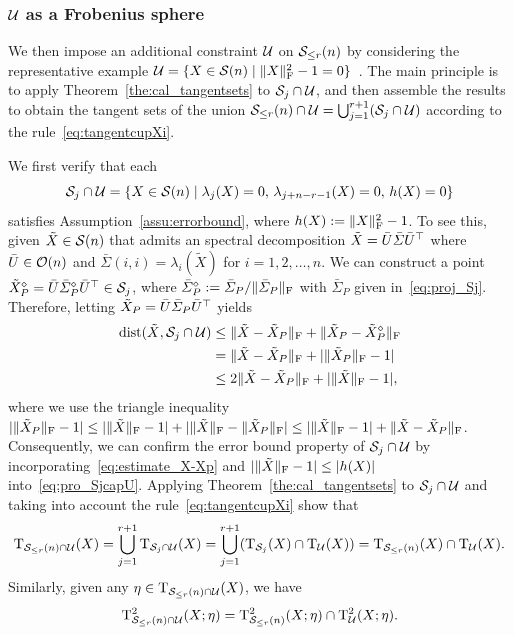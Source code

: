 \subsubsection{$\mathcal{U}$ as a Frobenius sphere}
We then impose an additional constraint $\mathcal{U}$ on $\mathcal{S}_{\le r}(n)$ by considering the representative example $\mathcal{U}=\{X\in\mathcal{S}(n)\mid \|X\|_{\mathrm{F}}^2-1=0\}$~\cite{cason2013iterative,li2020jotaspectral}. The main principle is to apply Theorem~\ref{the:cal_tangentsets} to $\mathcal{S}_j\cap\mathcal{U}$, and then assemble the results to obtain the tangent sets of the union $\mathcal{S}_{\le r}(n)\cap\mathcal{U}=\bigcup_{j=1}^{r+1}(\mathcal{S}_j\cap\mathcal{U})$ according to the rule~\eqref{eq:tangentcupXi}.

We first verify that each 
$$\mathcal{S}_j\cap\mathcal{U}=\{X\in\mathcal{S}(n)\mid\lambda_{j}(X)=0,\,\lambda_{j+n-r-1}(X)=0,\,h(X)=0\}$$
satisfies Assumption~\ref{assu:errorbound}, where $h(X):=\|X\|_{\mathrm{F}}^2-1$. To see this, given $\tilde{X} \in \mathcal{S}(n)$ that admits an spectral decomposition $\tilde{X}=\bar{U} \bar{\varSigma}\bar{U}^\top$ where $\bar{U}\in\mathcal{O}(n)$ and $\bar{\varSigma}(i,i)=\lambda_i(\tilde{X})$ for $i=1,2,\ldots,n$. We can construct a point $\tilde{X}^{\diamond}_P=\bar{U}\bar{\varSigma}^{\diamond}_P\bar{U}^\top\in\mathcal{S}_j$, 
where $\bar{\varSigma}^{\diamond}_P:=\bar{\varSigma}_P/\|\bar{\varSigma}_P\|_{\mathrm{F}}$ with $\bar{\varSigma}_P$ given in~\eqref{eq:proj_Sj}. Therefore, letting $\tilde{X}_P=\bar{U}\bar{\varSigma}_P\bar{U}^\top$ yields
\begin{align}
\operatorname{dist}(\tilde{X},\mathcal{S}_j\cap\mathcal{U}) &\le \|\tilde{X}-\tilde{X}_P\|_{\mathrm{F}} + \|\tilde{X}_P-\tilde{X}^\diamond_P\|_{\mathrm{F}} \nonumber
\\
&= \|\tilde{X}-\tilde{X}_P\|_{\mathrm{F}} + |\|\tilde{X}_P\|_{\mathrm{F}}-1|  \nonumber
\\
&\le 2\|\tilde{X}-\tilde{X}_P\|_{\mathrm{F}} + |\|\tilde{X}\|_{\mathrm{F}}-1|, \label{eq:pro_SjcapU}
\end{align}
where we use the triangle inequality $|\|\tilde{X}_P\|_{\mathrm{F}}-1|\le |\|\tilde{X}\|_{\mathrm{F}}-1| + |\|\tilde{X}\|_{\mathrm{F}}-\|\tilde{X}_P\|_{\mathrm{F}}|\le |\|\tilde{X}\|_{\mathrm{F}}-1| + \|\tilde{X}-\tilde{X}_P\|_{\mathrm{F}}$. Consequently, we can confirm the error bound property of $\mathcal{S}_j\cap\mathcal{U}$ by incorporating~\eqref{eq:estimate_X-Xp} and $|\|\tilde{X}\|_{\mathrm{F}}-1| \le |h(X)|$ into~\eqref{eq:pro_SjcapU}. Applying Theorem~\ref{the:cal_tangentsets} to $\mathcal{S}_j\cap\mathcal{U}$ and taking into account the rule~\eqref{eq:tangentcupXi} show that
\begin{align*}
    \mathrm{T}_{\mathcal{S}_{\le r}(n)\cap\mathcal{U}}(X) = \bigcup_{j=1}^{r+1} \mathrm{T}_{\mathcal{S}_j\cap\mathcal{U}}(X) =\bigcup_{j=1}^{r+1}(\mathrm{T}_{\mathcal{S}_j}(X) \cap \mathrm{T}_{\mathcal{U}}(X)) = \mathrm{T}_{\mathcal{S}_{\le r}(n)}(X)\cap\mathrm{T}_{\mathcal{U}}(X).
\end{align*}
Similarly, given any $\eta\in\mathrm{T}_{\mathcal{S}_{\le r}(n)\cap\mathcal{U}}(X)$, we have
\begin{align*}
    \mathrm{T}^2_{\mathcal{S}_{\le r}(n)\cap\mathcal{U}}(X;\eta) = \mathrm{T}^2_{\mathcal{S}_{\le r}(n)}(X;\eta)\cap\mathrm{T}^2_{\mathcal{U}}(X;\eta).
\end{align*}



